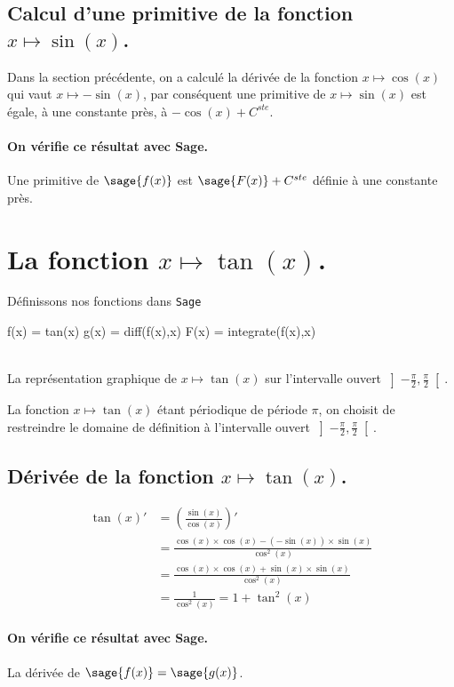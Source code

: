 \documentclass[a4paper,12pt]{report}
\begin{document}
\subsection{Calcul d'une primitive de la fonction  $x \mapsto \sin(x)$.}
Dans la section précédente, on a calculé la dérivée de la fonction $x \mapsto \cos(x)$ qui vaut $x \mapsto -\sin(x)$, par conséquent une primitive de $x \mapsto \sin(x)$ est égale, à une constante près, à $ - \cos(x) + C^{ste} $.
\paragraph{On vérifie ce résultat avec Sage.}
Une primitive de $\sage{f(x)}$ est $ \sage{F(x)} + C^{ste} $ définie à une constante près.


\section{La fonction  $x \mapsto \tan(x)$.}
Définissons nos fonctions dans {\texttt{Sage}}
\begin{sageblock}
    f(x) = tan(x)
    g(x) = diff(f(x),x)
    F(x) = integrate(f(x),x)
\end{sageblock}

\begin{center}
 \\
La représentation graphique de $x\mapsto \tan(x)$ sur l'intervalle ouvert $ \left] -\frac{\pi}{ 2} , \frac{\pi}{ 2} \right[ $.
\end{center}

La fonction $x \mapsto \tan(x)$ étant périodique de période $\pi$, on choisit de restreindre le domaine de définition à l'intervalle ouvert $ \left] -\frac{\pi}{ 2} , \frac{\pi}{ 2} \right[ $.

\subsection{Dérivée de la fonction $x \mapsto \tan(x)$.}
\begin{align*}
\tan(x)' 
& =  \left(\frac{\sin(x)}{\cos(x)}\right)' \\ 
& =  \frac{\cos(x) \times \cos(x) - (-\sin(x)) \times \sin(x)}{\cos^2(x)}  \\ 
& =  \frac{\cos(x) \times \cos(x) + \sin(x)\times \sin(x)}{\cos^2(x)}  \\ 
& =  \frac{1}{\cos^2(x)} = 1 + \tan^2(x)
\end{align*}
\paragraph{On vérifie ce résultat avec Sage.}
La dérivée de $\sage{f(x)} = \sage{g(x)} $.
\end{document}
